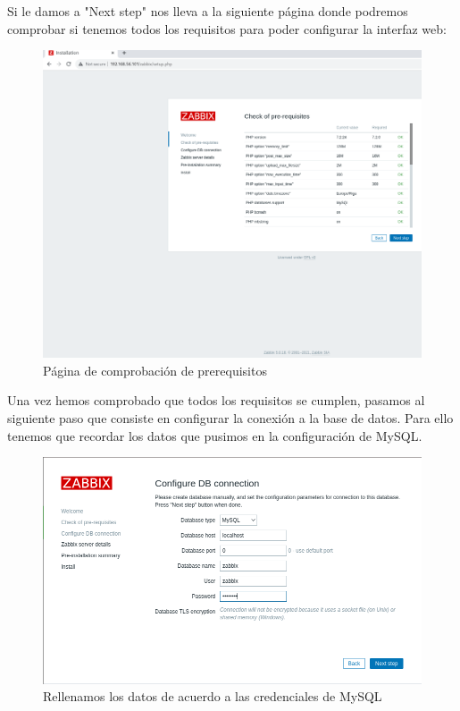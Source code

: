 Si le damos a "Next step"  nos lleva a la siguiente página donde podremos comprobar si tenemos todos los requisitos para poder configurar la interfaz web:

\begin{figure}[H]
	\centering
	\includegraphics[scale=0.3]{graphics/img6}
	\caption{Página de comprobación de prerequisitos}
\end{figure}

Una vez hemos comprobado que todos los requisitos se cumplen, pasamos al siguiente paso que consiste en configurar la conexión a la base de datos. Para ello tenemos que recordar los datos que pusimos en la configuración de MySQL.

\begin{figure}[H]
	\centering
	\includegraphics[scale=0.4]{graphics/img7}
	\caption{Rellenamos los datos de acuerdo a las credenciales de MySQL}
\end{figure}


